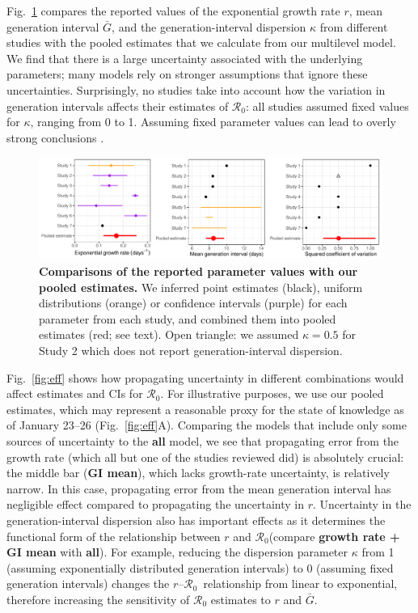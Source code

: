 \documentclass[12pt]{article}
\newcommand{\fref}[1]{Fig.~\ref{fig:#1}}
\newcommand{\Ro}{\ensuremath{{\mathcal R}_{0}}\xspace}
\begin{document}
\fref{assumption} compares the reported values of the exponential growth rate $r$, mean generation interval $\bar G$, and the generation-interval dispersion $\kappa$ from different studies with the pooled estimates that we calculate from our multilevel model.
We find that there is a large uncertainty associated with the underlying parameters;
many models rely on stronger assumptions that ignore these uncertainties.
Surprisingly, no studies take into account how the variation in generation intervals affects their estimates of \Ro:
all studies assumed fixed values for $\kappa$, ranging from 0 to 1.
Assuming fixed parameter values can lead to overly strong conclusions \citep{elderd2006uncertainty}.

\begin{figure}[t]
\includegraphics[width=\textwidth]{compare_assumption.pdf}
\caption{
\textbf{Comparisons of the reported parameter values with our pooled estimates.}
We inferred point estimates (black), uniform distributions (orange) or confidence intervals (purple) for each parameter from each study, and combined them into pooled estimates (red; see text).
Open triangle: we assumed $\kappa=0.5$ for Study 2 which does not report generation-interval dispersion.
}
\label{fig:assumption}
\end{figure}

\fref{eff} shows how propagating uncertainty in different combinations would affect estimates and CIs for \Ro. For illustrative purposes, we use our pooled estimates, which may represent a reasonable proxy for the state of knowledge as of January 23--26 (\fref{eff}A).
Comparing the models that include only some sources of uncertainty to the \textbf{all} model, we see that propagating error from the growth rate (which all but one of the studies reviewed did) is absolutely crucial: the middle bar (\textbf{GI mean}), which lacks growth-rate uncertainty, is relatively narrow.
In this case, propagating error from the mean generation interval has negligible effect compared to propagating the uncertainty in $r$.
Uncertainty in the generation-interval dispersion also has important effects as it determines the functional form of the relationship between $r$ and \Ro (compare \textbf{growth rate + GI mean} with \textbf{all}).
For example, reducing the dispersion parameter $\kappa$ from 1 (assuming exponentially distributed generation intervals) to 0 (assuming fixed generation intervals) changes the $r$--\Ro\ relationship from linear to exponential, therefore increasing the sensitivity of \Ro estimates to $r$ and $\bar G$.
\end{document}
